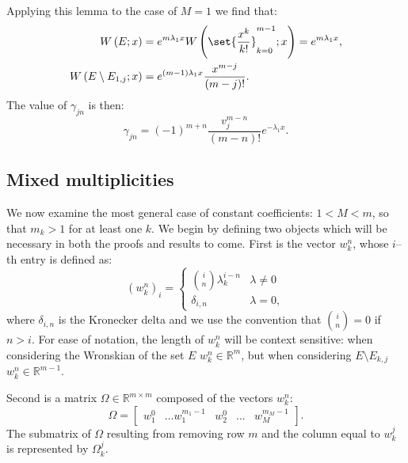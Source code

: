 \documentclass{article}
\begin{document}
Applying this lemma to the case of $M=1$ we find that:
\begin{align*}
\W{E}{x} & = e^{m \lambda_1 x} \W{\set{\Poly{k}}_{k=0}^{m-1}}{x} = e^{m \lambda_1 x} , \\
\W{E \setminus E_{1,j}}{x} & = e^{(m-1) \lambda_1 x} \poly{m-j} .
\end{align*}
The value of $\gamma_{jn}$ is then:
\begin{equation*}
\gamma_{jn} = (-1)^{m+n} \frac{v_j^{m-n}}{(m-n)!} e^{-\lambda_1 x} .
\end{equation*}

\subsection{Mixed multiplicities}


We now examine the most general case of constant coefficients: $1 < M < m$, so that $m_k > 1$ for at least one $k$.
We begin by defining two objects which will be necessary in both the proofs and results to come.
First is the vector $w_k^n$, whose $i$--th entry is defined as:
\begin{equation*}
\left ( w_k^n \right )_i = \begin{cases} \binom{i}{n} \lambda_k^{i - n} & \lambda \neq 0 \\
\delta_{i,n} & \lambda = 0, \end{cases}
\end{equation*}
where $\delta_{i,n}$ is the Kronecker delta and we use the convention that $\binom{i}{n} = 0$ if $n>i$.
For ease of notation, the length of $w_k^n$ will be context sensitive: when considering the Wronskian of the set $E$ $w_k^n \in \mathbb{R}^m$, but when considering $E \setminus E_{k,j}$ $w_k^n \in \mathbb{R}^{m-1}$.

Second is a matrix $\Omega \in \mathbb{R}^{m \times m}$ composed of the vectors $w_k^n$:
\begin{equation*}
\Omega = \begin{bmatrix} w_1^0 & \dots w_1^{m_1 - 1} & w_2^0 & \dots & w_M^{m_M-1} \end{bmatrix} .
\end{equation*}
The submatrix of $\Omega$ resulting from removing row $m$ and the column equal to $w_k^j$ is represented by $\Omega_k^j$.
\end{document}

